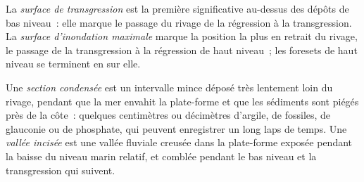 \begin{definition}\label{def:b3:sequence-stratigraphy:surfaces}
La \emph{surface de transgression} est la première
 significative au-dessus des dépôts de bas niveau~: elle marque le passage
du rivage de la régression à la transgression. La \emph{surface d'inondation
maximale} marque la position la plus en retrait du
rivage, le passage de la transgression à la régression de haut niveau~; les
foresets de haut niveau se terminent en  sur elle.
\end{definition}

\begin{definition}\label{def:b3:sequence-stratigraphy:condensed}
Une \emph{section condensée} est un intervalle mince
déposé très lentement loin du rivage, pendant que la mer envahit la plate-forme
et que les sédiments sont piégés près de la côte~: quelques centimètres ou décimètres
d'argile, de fossiles, de glauconie ou de phosphate, qui peuvent enregistrer un long laps de temps. Une
\emph{vallée incisée} est une vallée fluviale creusée dans la
plate-forme exposée pendant la baisse du niveau marin relatif, et comblée pendant le
bas niveau et la transgression qui suivent.
\end{definition}

